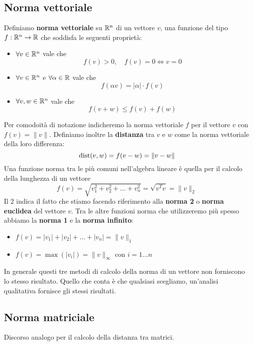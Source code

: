 \subsection{Norma vettoriale}
\begin{definition}
	Definiamo \textbf{norma vettoriale} su $\mathbb{R}^n$ di un vettore $v$, una funzione del tipo $f : \mathbb{R}^n \to \mathbb{R}$ che
	soddisfa le seguenti proprietà:
	\begin{itemize}
		\item $\forall v \in \mathbb{R}^n$ vale che
		      \[ f(v) > 0, \quad f(v) = 0 \Leftrightarrow v = 0 \]
		\item $\forall v \in \mathbb{R}^n$ e $\forall \alpha \in \mathbb{R}$ vale che
		      \[ f(\alpha v) = |\alpha| \cdot f(v) \]
		\item $\forall v, w \in \mathbb{R}^n$ vale che
		      \[ f(v + w) \leq f(v) + f(w) \]
	\end{itemize}
\end{definition}

Per comodoità di notazione indicheremo la norma vettoriale $f$ per il vettore $v$ con $f(v) = \| v \|$. Definiamo
inoltre la \textbf{distanza} tra $v$ e $w$ come la norma vettoriale della loro differenza:
\[ \operatorname{dist}(v, w) = f(v - w) = \| v - w \| \]
Una funzione norma tra le più comuni nell'algebra lineare è quella per il calcolo della lunghezza di un vettore
\[ f(v) = \sqrt{v_1^2 + v_2^2 + \dots + v_n^2} = \sqrt{v^T v} = \| v \|_2 \]
Il 2 indica il fatto che stiamo facendo riferimento alla \textbf{norma 2} o \textbf{norma euclidea} del vettore $v$.
Tra le altre funzioni norma che utilizzeremo più spesso abbiamo la \textbf{norma 1} e la \textbf{norma infinito}:
\begin{itemize}
	\item $f(v) = |v_1| + |v_2| + \dots + |v_n| = \| v \|_1$
	\item $f(v) = \max(|v_i|) = \| v \|_\infty$ con $i = 1 \dots n$
\end{itemize}
In generale questi tre metodi di calcolo della norma di un vettore non forniscono lo stesso risultato. Quello che
conta è che qualsiasi scegliamo, un'analisi qualitativa fornisce gli stessi risultati.

\subsection{Norma matriciale}
Discorso analogo per il calcolo della distanza tra matrici.

